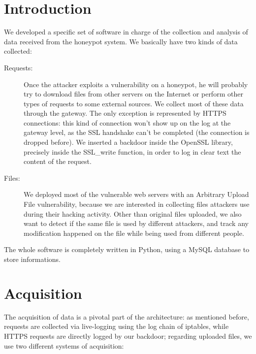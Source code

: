 \section{Introduction}

We developed a specific set of software in charge of the collection and analysis of data received from the honeypot system.
We basically have two kinds of data collected:
\begin{description}
\item[Requests: ] Once the attacker exploits a vulnerability on a honeypot, he will probably try to download files from other servers on the Internet or perform other types of requests to some external sources. We collect most of these data through the gateway. The only exception is represented by HTTPS connections: this kind of connection won't show up on the log at the gateway level, as the SSL handshake can't be completed (the connection is dropped before). We inserted a backdoor inside the OpenSSL library, precisely inside the SSL\_write function, in order to log in clear text the content of the request.

\item[Files: ] We deployed most of the vulnerable web servers with an Arbitrary Upload File vulnerability, because we are interested in collecting files attackers use during their hacking activity. Other than original files uploaded, we also want to detect if the same file is used by different attackers, and track any modification happened on the file while being used from different people.
\end{description}

The whole software is completely written in Python, using a MySQL database to store informations.

\section{Acquisition}

The acquisition of data is a pivotal part of the architecture: as mentioned before, requests are collected via live-logging using the log chain of iptables, while HTTPS requests are directly logged by our backdoor; regarding uploaded files, we use two different systems of acquisition:

